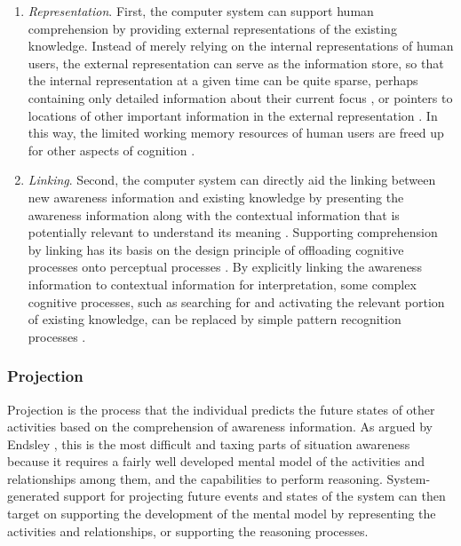 \begin{enumerate}
   \item \emph{Representation}. First, the computer system can support human comprehension by providing external representations of the existing knowledge. Instead of merely relying on the internal representations of human users, the external representation can serve as the information store, so that the internal representation at a given time can be quite sparse, perhaps containing only detailed information about their current focus \cite{Hegarty2011}, or pointers to locations of other important information in the external representation \cite{M.1996}. In this way, the limited working memory resources of human users are freed up for other aspects of cognition \cite{M.1996}.
   \item \emph{Linking}. Second, the computer system can directly aid the linking between new awareness information and existing knowledge by presenting the awareness information along with the contextual information that is potentially relevant to understand its meaning \cite{Tomaszewski2010}. Supporting comprehension by linking has its basis on the design principle of offloading cognitive processes onto perceptual processes \cite{M.1996}. By explicitly linking the awareness information to contextual information for interpretation, some complex cognitive processes, such as searching for and activating the relevant portion of existing knowledge, can be replaced by simple pattern recognition processes \cite{Hegarty2011}. 
\end{enumerate}

\subsubsection*{Projection} %
\label{ssub:projection}
Projection is the process that the individual predicts the future states of other activities based on the comprehension of awareness information. As argued by Endsley \cite{Endsley1995}, this is the most difficult and taxing parts of situation awareness because it requires a fairly well developed mental model of the activities and relationships among them, and the capabilities to perform reasoning. System-generated support for projecting future events and states of the system can then target on supporting the development of the mental model by representing the activities and relationships, or supporting the reasoning processes. 

